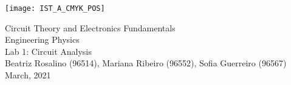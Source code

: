 
\thispagestyle {empty}

\texttt{[image: IST\_A\_CMYK\_POS]}

\begin{center}
%
\vspace{1.0cm}

\vspace{1cm}
{\FontLb Circuit Theory and Electronics Fundamentals} \\ %
\vspace{1cm}
{\FontSn Engineering Physics} \\ %
\vspace{1cm}
{\FontSn Lab 1: Circuit Analysis} \\
\vspace{1cm}
{\FontSn Beatriz Rosalino (96514), Mariana Ribeiro (96552), Sofia Guerreiro (96567)} \\
\vspace{1cm}
{ March, 2021} \\ %
%
\end{center}

